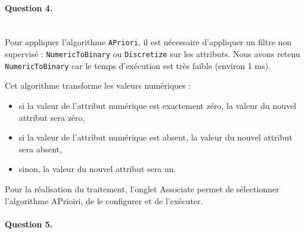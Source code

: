 \documentclass[a4paper,11pt]{article}
\begin{document}
\newpage
\paragraph{Question 4.} ~\\

    Pour appliquer l'algorithme \texttt{APriori}, il est nécessaire d'appliquer un filtre non supervisé : \texttt{NumericToBinary} ou \texttt{Discretize} sur les attributs. Nous avons retenu \texttt{NumericToBinary} car le temps d'exécution est très faible (environ 1 ms).
    
    Cet algorithme transforme les valeurs numériques : 
    \begin{itemize}
	\item si la valeur de l'attribut numérique est exactement zéro, la valeur du nouvel attribut sera zéro,
	\item si la valeur de l'attribut numérique est absent, la valeur du nouvel attribut sera absent,
	\item sinon, la valeur du nouvel attribut sera un.\\
	\end{itemize}
	
    Pour la réalisation du traitement, l'onglet \og{}Associate\fg{} permet de sélectionner l'algorithme APrioiri, de le configurer et de l'exécuter.
    
    

\paragraph{Question 5.} ~\\
	
	
	


				
		
\end{document}
